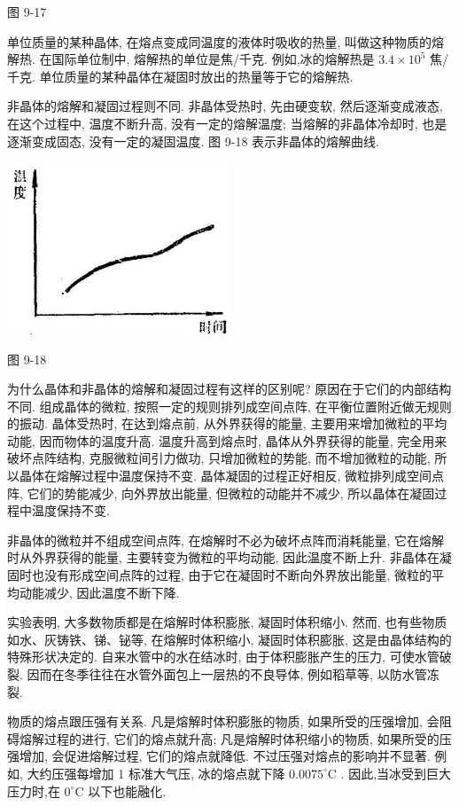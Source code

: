 \documentclass[10pt]{article}
\begin{document}
图 9-17

单位质量的某种晶体, 在熔点变成同温度的液体时吸收的热量, 叫做这种物质的熔解热. 在国际单位制中, 熔解热的单位是焦/千克. 例如,冰的熔解热是 \({3.4} \times {10}^{5}\) 焦/千克. 单位质量的某种晶体在凝固时放出的热量等于它的熔解热.

非晶体的熔解和凝固过程则不同. 非晶体受热时, 先由硬变软, 然后逐渐变成液态, 在这个过程中, 温度不断升高, 没有一定的熔解温度; 当熔解的非晶体冷却时, 也是逐渐变成固态, 没有一定的凝固温度. 图 9-18 表示非晶体的熔解曲线.

\begin{center}
\includegraphics[max width=0.5\textwidth]{images/01912d55-147c-70aa-b0e0-1782a122f948_273_360392.jpg}
\end{center}

图 9-18

为什么晶体和非晶体的熔解和凝固过程有这样的区别呢? 原因在于它们的内部结构不同. 组成晶体的微粒, 按照一定的规则排列成空间点阵, 在平衡位置附近做无规则的振动. 晶体受热时, 在达到熔点前, 从外界获得的能量, 主要用来增加微粒的平均动能, 因而物体的温度升高. 温度升高到熔点时, 晶体从外界获得的能量, 完全用来破坏点阵结构, 克服微粒间引力做功, 只增加微粒的势能, 而不增加微粒的动能, 所以晶体在熔解过程中温度保持不变. 晶体凝固的过程正好相反, 微粒排列成空间点阵, 它们的势能减少, 向外界放出能量, 但微粒的动能并不减少, 所以晶体在凝固过程中温度保持不变.

非晶体的微粒并不组成空间点阵, 在熔解时不必为破坏点阵而消耗能量, 它在熔解时从外界获得的能量, 主要转变为微粒的平均动能, 因此温度不断上升. 非晶体在凝固时也没有形成空间点阵的过程, 由于它在凝固时不断向外界放出能量, 微粒的平均动能减少, 因此温度不断下降.

实验表明, 大多数物质都是在熔解时体积膨胀, 凝固时体积缩小. 然而, 也有些物质如水、灰铸铁、锑、铋等, 在熔解时体积缩小, 凝固时体积膨胀, 这是由晶体结构的特殊形状决定的. 自来水管中的水在结冰时, 由于体积膨胀产生的压力, 可使水管破裂. 因而在冬季往往在水管外面包上一层热的不良导体, 例如稻草等, 以防水管冻裂.

物质的熔点跟压强有关系. 凡是熔解时体积膨胀的物质, 如果所受的压强增加, 会阻碍熔解过程的进行, 它们的熔点就升高; 凡是熔解时体积缩小的物质, 如果所受的压强增加, 会促进熔解过程, 它们的熔点就降低. 不过压强对熔点的影响并不显著. 例如, 大约压强每增加 1 标准大气压, 冰的熔点就下降 \({0.0075}^{ \circ }\mathrm{C}\) . 因此,当冰受到巨大压力时,在 \({0}^{ \circ }\mathrm{C}\) 以下也能融化.
\end{document}
